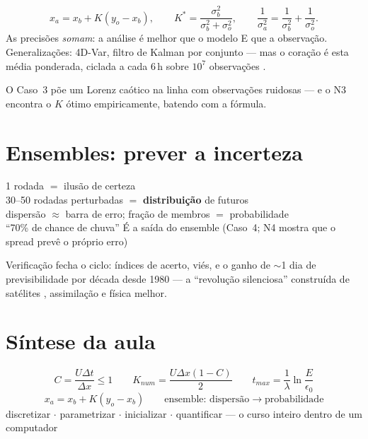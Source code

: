 \documentclass[11pt]{article}
\begin{document}
\begin{formalivro}
\[ x_a = x_b + K(y_o - x_b),\qquad
K^* = \frac{\sigma_b^2}{\sigma_b^2 + \sigma_o^2},\qquad
\frac{1}{\sigma_a^2} = \frac{1}{\sigma_b^2} + \frac{1}{\sigma_o^2}. \]
As precisões \emph{somam}: a análise é melhor que o modelo E que a
observação. Generalizações: 4D-Var, filtro de Kalman por conjunto —
mas o coração é esta média ponderada, ciclada a cada 6\,h sobre
$10^7$ observações  .
\end{formalivro}

O Caso~3 põe um Lorenz caótico na linha com observações ruidosas — e
o N3 encontra o $K$ ótimo empiricamente, batendo com a fórmula.

\section{Ensembles: prever a incerteza}\label{sec:ensemble}

\begin{noquadro}
1 rodada $=$ ilusão de certeza\\
30--50 rodadas perturbadas $=$ \textbf{distribuição} de futuros\\
dispersão $\approx$ barra de erro; fração de membros $=$
probabilidade\\[2pt]
``70\% de chance de chuva'' É a saída do ensemble (Caso~4; N4 mostra
que o spread prevê o próprio erro)
\end{noquadro}

Verificação fecha o ciclo: índices de acerto, viés, e o ganho de
$\sim$1 dia de previsibilidade por década desde 1980 — a ``revolução
silenciosa'' construída de satélites ,
assimilação e física melhor.

\section{Síntese da aula}

\begin{noquadro}
\[ C = \frac{U\Delta t}{\Delta x} \le 1 \qquad
K_{num} = \frac{U\Delta x(1-C)}{2} \qquad
t_{max} = \frac{1}{\lambda}\ln\frac{E}{\epsilon_0} \]
\[ x_a = x_b + K(y_o - x_b) \qquad
\text{ensemble: dispersão} \to \text{probabilidade} \]
discretizar $\cdot$ parametrizar $\cdot$ inicializar $\cdot$
quantificar — o curso inteiro dentro de um computador
\end{noquadro}
\end{document}
